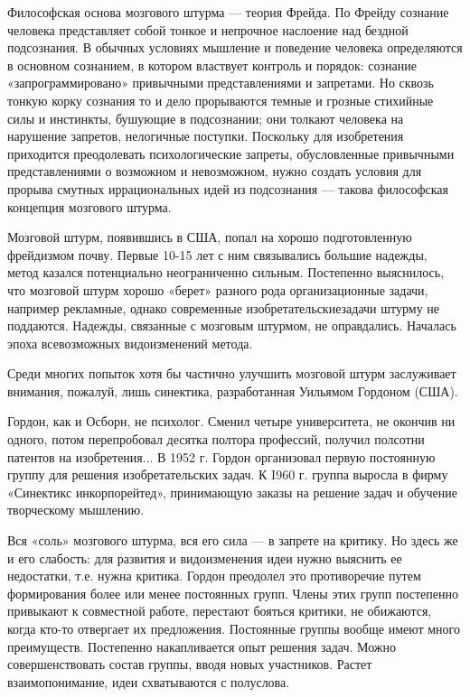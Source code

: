 Философская  основа  мозгового  штурма  —  теория  Фрейда.  По  Фрейду
сознание человека представляет собой  тонкое и непрочное наслоение над
бездной подсознания. В обычных  условиях мышление и поведение человека
определяются  в основном  сознанием,  в котором  властвует контроль  и
порядок:  сознание  «запрограммировано» привычными  представлениями  и
запретами.  Но сквозь  тонкую  корку сознания  то  и дело  прорываются
темные и грозные  стихийные силы и инстинкты,  бушующие в подсознании;
они  толкают  человека  на нарушение  запретов,  нелогичные  поступки.
Поскольку  для  изобретения  приходится  преодолевать  психологические
запреты,  обусловленные  привычными   представлениями  о  возможном  и
невозможном, нужно создать условия  для прорыва смутных иррациональных
идей из подсознания — такова философская концепция мозгового штурма.

Мозговой  штурм,  появившись в  США,  попал  на хорошо  подготовленную
фрейдизмом  почву.   Первые  10-15  лет  с   ним  связывались  большие
надежды, метод казался  потенциально неограниченно сильным. Постепенно
выяснилось,   что  мозговой   штурм   хорошо   «берет»  разного   рода
организационные   задачи,  например   рекламные,  однако   современные
изобретательскиезадачи  штурму  не  поддаются.  Надежды,  связанные  с
мозговым   штурмом,  не   оправдались.  Началась   эпоха  всевозможных
видоизменений метода.

Среди  многих  попыток  хотя   бы  частично  улучшить  мозговой  штурм
заслуживает внимания, пожалуй,  лишь синектика, разработанная Уильямом
Гордоном (США).

Гордон,  как и  Осборн, не  психолог. Сменил  четыре университета,  не
окончив  ни  одного,  потом перепробовал  десятка  полтора  профессий,
получил  полсотни   патентов  на  изобретения...  В   1952  г.  Гордон
организовал  первую  постоянную  группу для  решения  изобретательских
задач. К  I960 г.  группа выросла  в фирму  «Синектикс инкорпорейтед»,
принимающую заказы на решение задач и обучение творческому мышлению.

Вся «соль»  мозгового штурма,  вся его  сила —  в запрете  на критику.
Но  здесь  же  и  его  слабость: для  развития  и  видоизменения  идеи
нужно  выяснить ее  недостатки, т.е.  нужна критика.  Гордон преодолел
это  противоречие  путем  формирования   более  или  менее  постоянных
групп.  Члены этих  групп  постепенно привыкают  к совместной  работе,
перестают  бояться  критики,  не  обижаются,  когда  кто-то  отвергает
их  предложения. Постоянные  группы  вообще  имеют много  преимуществ.
Постепенно  накапливается опыт  решения задач.  Можно совершенствовать
состав группы,  вводя новых  участников. Растет  взаимопонимание, идеи
схватываются с полуслова.

